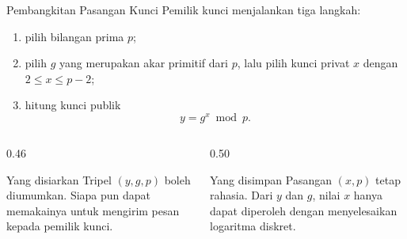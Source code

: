 \documentclass[aspectratio=169,11pt]{beamer}
\begin{document}
\begin{frame}{Pembangkitan Pasangan Kunci}
    \footnotesize
    Pemilik kunci menjalankan tiga langkah:
    \begin{enumerate}
        \item pilih bilangan prima $p$;
        \item pilih $g$ yang merupakan akar primitif dari $p$, lalu pilih
              kunci privat $x$ dengan $2 \le x \le p-2$;
        \item hitung kunci publik
              \[
                  y = g^{x} \bmod p .
              \]
    \end{enumerate}
    \vspace{0.1cm}
    \begin{columns}[T,onlytextwidth]
        \begin{column}{0.46\textwidth}
            \begin{exampleblock}{Yang disiarkan}
                \footnotesize
                Tripel $(y,g,p)$ boleh diumumkan. Siapa pun dapat memakainya
                untuk mengirim pesan kepada pemilik kunci.
            \end{exampleblock}
        \end{column}
        \begin{column}{0.50\textwidth}
            \begin{alertblock}{Yang disimpan}
                \footnotesize
                Pasangan $(x,p)$ tetap rahasia. Dari $y$ dan $g$, nilai $x$
                hanya dapat diperoleh dengan menyelesaikan logaritma
                diskret.
            \end{alertblock}
        \end{column}
    \end{columns}
\end{frame}
\end{document}
